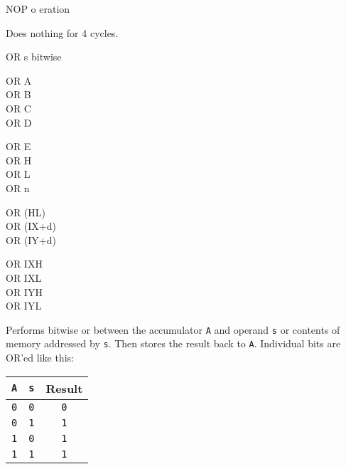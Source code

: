 \documentclass[12pt,twoside,openright,a4paper]{book}
\begin{document}
\begin{basedescript}{
	\desclabelstyle{\multilinelabel}
	\desclabelwidth{3cm}}
	\begin{DetailItem}{NOP}
		{o eration}
		{}

		Does nothing for 4 cycles.
		
		\begin{DetailEffects}
			\FlagsNOP
		\end{DetailEffects}
						
		\begin{DetailTiming}
			\DetailTime{1}{4}
		\end{DetailTiming}

	\end{DetailItem}

	\begin{DetailItem}{OR s}
		{bitwise \IH{OR}}
		{\SymOR{s}}

		\begin{DetailVariants}[4]
			OR A\\
			OR B\\
			OR C\\
			OR D

			\columnbreak
			OR E\\
			OR H\\
			OR L\\
			OR n

			\columnbreak
			OR (HL)\\
			OR (IX+d)\\
			OR (IY+d)

			\columnbreak
			OR IXH\UNDOC\\
			OR IXL\UNDOC\\
			OR IYH\UNDOC\\
			OR IYL\UNDOC
		\end{DetailVariants}

		Performs bitwise or between the accumulator {\tt A} and operand {\tt s} or contents of memory addressed by {\tt s}. Then stores the result back to {\tt A}. Individual bits are OR'ed like this:

		\begin{tabular}{cc|c}
			{\tt A} & {\tt s} & Result \\
			\hline
			{\tt 0} & {\tt 0} & {\tt 0} \\
			{\tt 0} & {\tt 1} & {\tt 1} \\
			{\tt 1} & {\tt 0} & {\tt 1} \\
			{\tt 1} & {\tt 1} & {\tt 1} \\
		\end{tabular}

		\begin{DetailEffects}[v]
			\FlagsORr
		\end{DetailEffects}
				

\end{DetailItem}
\end{basedescript}
\end{document}
